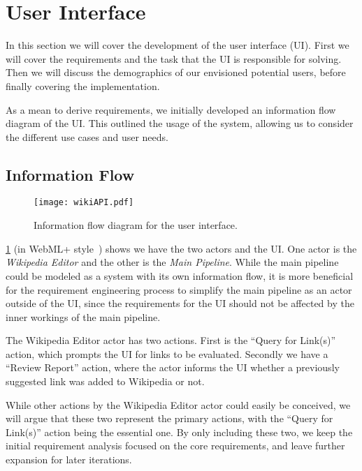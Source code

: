 \section{User Interface}\label{sec:design_ui}

In this section we will cover the development of the user interface (UI). First we will cover the requirements and the task that the UI is responsible for solving. Then we will discuss the demographics of our envisioned potential users, before finally covering the implementation.

As a mean to derive requirements, we initially developed an information flow diagram of the UI\@. This outlined the usage of the system, allowing us to consider the different use cases and user needs.

\subsection{Information Flow}

\begin{figure}[tbp]
\centering
\texttt{[image: wikiAPI.pdf]}
\caption{Information flow diagram for the user interface.}
\label{fig:information_flow_UI}
\end{figure}

\cref{fig:information_flow_UI} (in WebML+ style~\cite{Casteleyn2009}) shows we have the two actors and the UI\@{}. One actor is the \emph{Wikipedia Editor} and the other is the \emph{Main Pipeline}. While the main pipeline could be modeled as a system with its own information flow, it is more beneficial for the requirement engineering process to simplify the main pipeline as an actor outside of the UI, since the requirements for the UI should not be affected by the inner workings of the main pipeline.

The Wikipedia Editor actor has two actions. First is the \enquote{Query for Link(s)} action, which prompts the UI for links to be evaluated. Secondly we have a \enquote{Review Report} action, where the actor informs the UI whether a previously suggested link was added to Wikipedia or not.

While other actions by the Wikipedia Editor actor could easily be conceived, we will argue that these two represent the primary actions, with the \enquote{Query for Link(s)} action being the essential one. By only including these two, we keep the initial requirement analysis focused on the core requirements, and leave further expansion for later iterations.


